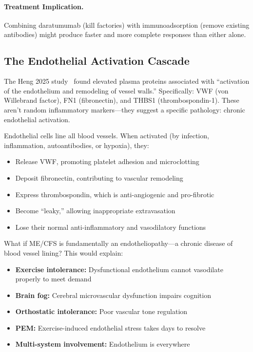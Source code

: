 \paragraph{Treatment Implication.} Combining daratumumab (kill factories) with immunoadsorption (remove existing antibodies) might produce faster and more complete responses than either alone.

\subsection{The Endothelial Activation Cascade}

\begin{open_question}
The Heng 2025 study~\cite{heng2025mecfs} found elevated plasma proteins associated with ``activation of the endothelium and remodeling of vessel walls.'' Specifically: VWF (von Willebrand factor), FN1 (fibronectin), and THBS1 (thrombospondin-1). These aren't random inflammatory markers---they suggest a specific pathology: chronic endothelial activation.

Endothelial cells line all blood vessels. When activated (by infection, inflammation, autoantibodies, or hypoxia), they:
\begin{itemize}
    \item Release VWF, promoting platelet adhesion and microclotting
    \item Deposit fibronectin, contributing to vascular remodeling
    \item Express thrombospondin, which is anti-angiogenic and pro-fibrotic
    \item Become ``leaky,'' allowing inappropriate extravasation
    \item Lose their normal anti-inflammatory and vasodilatory functions
\end{itemize}

What if ME/CFS is fundamentally an endotheliopathy---a chronic disease of blood vessel lining? This would explain:
\begin{itemize}
    \item \textbf{Exercise intolerance:} Dysfunctional endothelium cannot vasodilate properly to meet demand
    \item \textbf{Brain fog:} Cerebral microvascular dysfunction impairs cognition
    \item \textbf{Orthostatic intolerance:} Poor vascular tone regulation
    \item \textbf{PEM:} Exercise-induced endothelial stress takes days to resolve
    \item \textbf{Multi-system involvement:} Endothelium is everywhere
\end{itemize}
\end{open_question}

